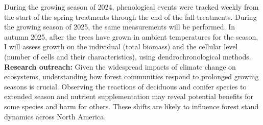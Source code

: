 \documentclass{article}
\begin{document}
During the growing season of 2024, phenological events were tracked weekly from the start of the spring treatments through the end of the fall treatments. During the growing season of 2025, the same measurements will be performed. In autumn 2025, after the trees have grown in ambient temperatures for the season, I will assess growth on the individual (total biomass) and the cellular level (number of cells and their characteristics), using dendrochronological methods. \\
\textbf{Research outreach:} Given the widespread impacts of climate change on ecosystems, understanding how forest communities respond to prolonged growing seasons is crucial. Observing the reactions of deciduous and conifer species to extended season and nutrient supplementation may reveal potential benefits for some species and harm for others. These shifts are likely to influence forest stand dynamics across North America.


\end{document}
